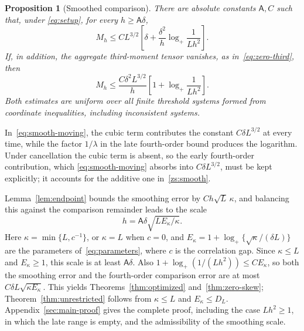 \documentclass[11pt,letterpaper]{article}
\newif\ifshowrev
\newcommand{\rev}[1]{\ifshowrev{\color{revblue}%
\hypersetup{linkcolor=revblue,citecolor=revblue,urlcolor=revblue}#1}\else#1\fi}
\newcommand{\rs}[1]{\ifshowrev{\color{revblue}#1}\else#1\fi}
\newenvironment{revblock}{\ifshowrev\color{revblue}%
\hypersetup{linkcolor=revblue,citecolor=revblue,urlcolor=revblue}\fi}{}
\newcommand{\Ac}{\rs{\mathsf A}}
\newif\ifshowtrim
\newcommand{\trim}[1]{\ifshowtrim{\color{revblue}%
\hypersetup{linkcolor=revblue,citecolor=revblue,urlcolor=revblue}#1}\else#1\fi}
\newif\ifshowlin
\newcommand{\lin}[1]{\ifshowlin{\color{revblue}%
\hypersetup{linkcolor=revblue,citecolor=revblue,urlcolor=revblue}#1}\else#1\fi}
\newtheorem{proposition}{Proposition}
\theoremstyle{remark}
\begin{document}
\begin{revblock}
\begin{proposition}[Smoothed comparison]\label{prop:moving-cutoff}
\label{zs:smooth-proposition}
There are absolute constants \(\mathsf A,C\) such that, under
\eqref{eq:setup}, for every \(h\ge\mathsf A\delta\),
\begin{equation}
 M_h\le CL^{3/2}\left[
 \delta+\frac{\delta^2}{h}\log_+\frac1{Lh^2}\right].
 \tag{S*}\label{eq:smooth-moving}
\end{equation}
If, in addition, the aggregate third-moment tensor vanishes,
as in~\eqref{eq:zero-third}, then
\begin{equation}
 M_h\le\frac{C\delta^2L^{3/2}}h
 \left[1+\log_+\frac1{Lh^2}\right].
 \label{zs:smooth}
\end{equation}
Both estimates are uniform over all finite threshold systems formed from
coordinate inequalities, including inconsistent systems.
\end{proposition}

In~\eqref{eq:smooth-moving}, the cubic term contributes the constant
\(C\delta L^{3/2}\) at every time, while the factor \(1/\lambda\) in the
late fourth-order bound produces the logarithm. Under cancellation the
cubic term is absent, so the early fourth-order contribution, which
\eqref{eq:smooth-moving} absorbs into \(C\delta L^{3/2}\), must be kept
explicitly; it accounts for the additive one in~\eqref{zs:smooth}.
\end{revblock}

\rev{Lemma~\ref{lem:endpoint} bounds the smoothing error by
\(Ch\sqrt L\,\kappa\), and balancing this against the comparison
remainder leads to the scale}
\begin{equation}
 h=\Ac\delta\sqrt{LE_\kappa/\kappa}.
 \label{eq:optimal-scale}
\end{equation}
\trim{Here \(\kappa=\min\{L,c^{-1}\}\), or \(\kappa=L\) when \(c=0\), and
\(E_\kappa=1+\log_+\{\sqrt\kappa/(\delta L)\}\) are the parameters
of~\eqref{eq:parameters}, where \(c\) is the correlation gap.}
Since \(\kappa\le L\) and \(E_\kappa\ge1\), this scale is at
least \(\Ac\delta\). Also
\(1+\log_+(1/(Lh^2))\le CE_\kappa\), so both the smoothing
error and the fourth-order comparison error are at most
\(C\delta L\sqrt{\kappa E_\kappa}\).
This yields Theorems~\ref{thm:optimized} and~\ref{thm:zero-skew};
Theorem~\ref{thm:unrestricted} follows from \(\kappa\le L\) and
\(E_\kappa\le D_L\). Appendix~\ref{sec:main-proof} gives the complete proof, including
\lin{the case \(Lh^2\ge1\), in which the late range is empty,} and the
admissibility of the smoothing scale.
\end{document}
